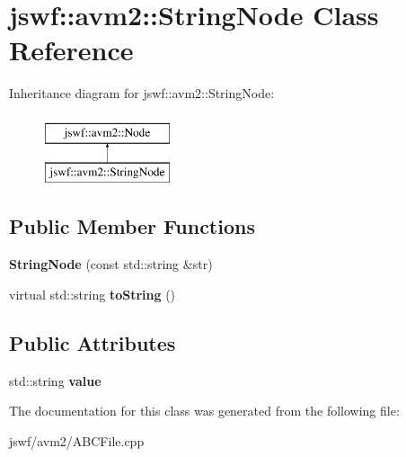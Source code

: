\hypertarget{classjswf_1_1avm2_1_1_string_node}{\section{jswf\+:\+:avm2\+:\+:String\+Node Class Reference}
\label{classjswf_1_1avm2_1_1_string_node}
}
Inheritance diagram for jswf\+:\+:avm2\+:\+:String\+Node\+:\begin{figure}[H]
\begin{center}
\leavevmode
\includegraphics[height=2.000000cm]{classjswf_1_1avm2_1_1_string_node}
\end{center}
\end{figure}
\subsection*{Public Member Functions}
\begin{DoxyCompactItemize}
\item 
\hypertarget{classjswf_1_1avm2_1_1_string_node_ad9d236904199898d20e944336a2dec09}{{\bfseries String\+Node} (const std\+::string \&str)}\label{classjswf_1_1avm2_1_1_string_node_ad9d236904199898d20e944336a2dec09}

\item 
\hypertarget{classjswf_1_1avm2_1_1_string_node_aad841b0618fdfc94fa39ec106d04f66b}{virtual std\+::string {\bfseries to\+String} ()}\label{classjswf_1_1avm2_1_1_string_node_aad841b0618fdfc94fa39ec106d04f66b}

\end{DoxyCompactItemize}
\subsection*{Public Attributes}
\begin{DoxyCompactItemize}
\item 
\hypertarget{classjswf_1_1avm2_1_1_string_node_abc5629f9b0386771c7d71d7b2cdbbb89}{std\+::string {\bfseries value}}\label{classjswf_1_1avm2_1_1_string_node_abc5629f9b0386771c7d71d7b2cdbbb89}

\end{DoxyCompactItemize}


The documentation for this class was generated from the following file\+:\begin{DoxyCompactItemize}
\item 
jswf/avm2/A\+B\+C\+File.\+cpp\end{DoxyCompactItemize}
